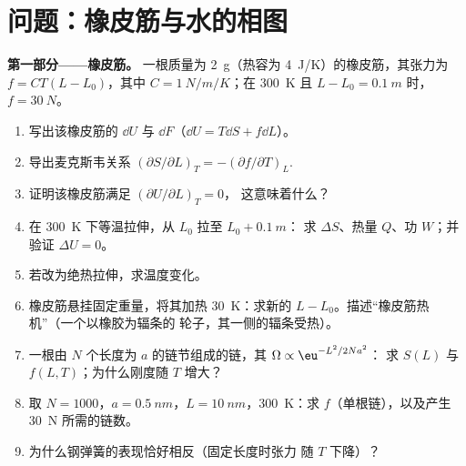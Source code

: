 \section{问题：橡皮筋与水的相图}

\begin{problem}\label{pb:b2:thermodynamic-potentials:1}
\textbf{第一部分——橡皮筋。}
一根质量为 \qty{2}{g}（热容为 \qty{4}{J/K}）的橡皮筋，其张力为
$f = CT(L - L_0)$，其中 $C = \qty{1}{N/m/K}$；在 \qty{300}{K} 且 $L - L_0 =
\qty{0.1}{m}$ 时，$f = \qty{30}{N}$。
\begin{enumerate}
  \item 写出该橡皮筋的 $\dd U$ 与 $\dd F$（$\dd U = T\dd S + f\dd L$）。
  \item 导出麦克斯韦关系 $(\partial S/\partial L)_T = -(\partial
        f/\partial T)_L$.
  \item 证明该橡皮筋满足 $(\partial U/\partial L)_T = 0$，
        这意味着什么？
  \item 在 \qty{300}{K} 下等温拉伸，从 $L_0$ 拉至 $L_0 + \qty{0.1}{m}$：
        求 $\Delta S$、热量 $Q$、功 $W$；并验证 $\Delta U = 0$。
  \item 若改为绝热拉伸，求温度变化。
  \item 橡皮筋悬挂固定重量，将其加热 \qty{30}{K}：求新的
        $L - L_0$。描述“橡皮筋热机”（一个以橡胶为辐条的
        轮子，其一侧的辐条受热）。
  \item 一根由 $N$ 个长度为 $a$ 的链节组成的链，其 $\Omega \propto \eu^{-L^2/2Na^2}$：
        求 $S(L)$ 与 $f(L,T)$；为什么刚度随 $T$ 增大？
  \item 取 $N = 1000$，$a = \qty{0.5}{nm}$，$L = \qty{10}{nm}$，\qty{300}{K}：求
        $f$（单根链），以及产生 \qty{30}{N} 所需的链数。
  \item 为什么钢弹簧的表现恰好相反（固定长度时张力
        随 $T$ 下降）？
\end{enumerate}


\end{problem}
